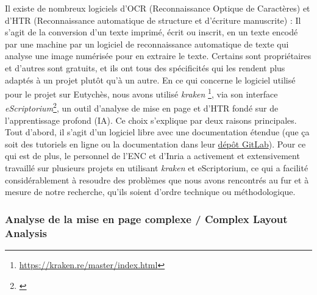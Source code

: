 \documentclass[a4paper, twoside, 12pt]{book}
\begin{document}
Il existe de nombreux logiciels d'OCR (Reconnaissance Optique de Caractères) et d'HTR (Reconnaissance automatique de structure et d’écriture manuscrite) : Il s’agit de la conversion d’un texte imprimé, écrit ou inscrit, en un texte encodé par une machine par un logiciel de reconnaissance automatique de texte qui analyse une image numérisée pour en extraire le texte. Certains sont propriétaires et d'autres sont gratuits, et ils ont tous des spécificités qui les rendent plus adaptés à un projet plutôt qu'à un autre. En ce qui concerne le logiciel utilisé pour le projet sur Eutychès, nous avons utilisé \textit{kraken} \footnote{ \url{https://kraken.re/master/index.html}}, via son interface \textit{eScriptorium}\footnote{\cite{kiessling2019escriptorium}}, un outil d’analyse de mise en page et d’HTR fondé sur de l’apprentissage profond (IA). Ce choix s'explique par deux raisons principales. Tout d'abord, il s'agit d'un logiciel libre avec une documentation étendue (que ça soit des tutoriels en ligne ou la documentation dans leur \href{https://gitlab.inria.fr/scripta/escriptorium}{dépôt GitLab}). Pour ce qui est de plus, le personnel de l'ENC et d'Inria a activement et extensivement travaillé sur plusieurs projets en utilisant \textit{kraken} et eScriptorium\textit{}, ce qui a facilité considérablement à resoudre des problèmes que nous avons rencontrés au fur et à mesure de notre recherche, qu'ils soient d'ordre technique ou méthodologique. 

\subsubsection{ Analyse de la mise en page complexe / Complex Layout Analysis}
\end{document}
